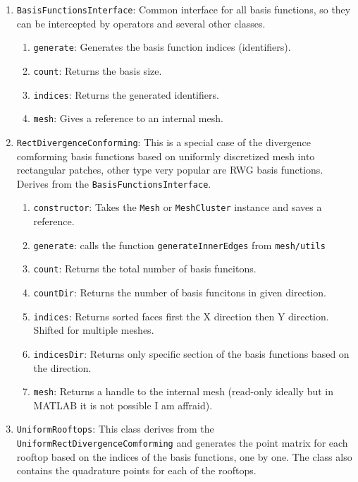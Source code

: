 \documentclass[9pt]{article}
\begin{document}
    \begin{enumerate}[label=\Roman*.]
        \item \texttt{BasisFunctionsInterface}: Common interface for all basis functions, so they can be intercepted by operators and several other classes.
        \begin{enumerate}[label=\roman*.]
            \item \texttt{generate}: Generates the basis function indices (identifiers).
            \item \texttt{count}: Returns the basis size.
            \item \texttt{indices}: Returns the generated identifiers.
            \item \texttt{mesh}: Gives a reference to an internal mesh.
        \end{enumerate}
    \item \texttt{RectDivergenceConforming}: This is a special case of the divergence comforming basis functions based on uniformly discretized mesh into rectangular patches, other type very popular are RWG basis functions. Derives from the \texttt{BasisFunctionsInterface}.
        \begin{enumerate}[label=\roman*.]
            \item \texttt{constructor}: Takes the \texttt{Mesh} or \texttt{MeshCluster} instance and saves a reference.
            \item \texttt{generate}: calls the function \texttt{generateInnerEdges} from \texttt{mesh/utils}
            \item \texttt{count}: Returns the total number of basis funcitons.
            \item \texttt{countDir}: Returns the number of basis funcitons in given direction.
            \item \texttt{indices}: Returns sorted faces first the X direction then Y direction. Shifted for multiple meshes.
            \item \texttt{indicesDir}: Returns only specific section of the basis functions based on the direction.
            \item \texttt{mesh}: Returns a handle to the internal mesh (read-only ideally but in MATLAB it is not possible I am affraid).
        \end{enumerate}
        \item \texttt{UniformRooftops}: This class derives from the \texttt{UniformRectDivergenceComforming} and generates the point matrix for each rooftop based on the indices of the basis functions, one by one. The class also contains the quadrature points for each of the rooftops.

\end{enumerate}
\end{document}
